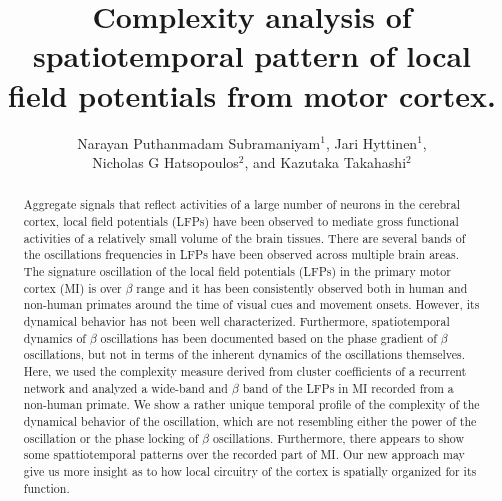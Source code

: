 \documentclass[a4paper]{jpconf}
\begin{document}
\title{Complexity analysis of spatiotemporal pattern of local field potentials from motor cortex.}

\author{Narayan Puthanmadam Subramaniyam$^1$, Jari Hyttinen$^1$, \\
Nicholas G Hatsopoulos$^2$, and Kazutaka Takahashi$^2$}

\address{1. Finland\\
2. Department of Organismal Biology and Anatomy, University of Chicago, Chicago, IL 60615, USA}



\begin{abstract}
Aggregate signals that reflect activities of a large number of neurons in the cerebral cortex, local field potentials (LFPs) have been observed to mediate gross functional activities of a relatively small volume of the brain tissues. There are several bands of the oscillations frequencies in LFPs have been observed across multiple brain areas. 
The signature oscillation of the local field potentials (LFPs) in the primary motor cortex (MI) is over $\beta$ range and it has been consistently observed both in human and non-human primates around the time of visual cues and movement onsets. 
However, its dynamical behavior has not been well characterized. Furthermore, spatiotemporal dynamics of $\beta$ oscillations has been documented based on the phase gradient of $\beta$ oscillations, but not in terms of the inherent dynamics of the oscillations themselves. Here, we used the complexity measure derived from cluster coefficients of a recurrent network and analyzed a wide-band and $\beta$ band of the LFPs in MI recorded from a non-human primate. We show a rather unique temporal profile of the complexity of the dynamical behavior of the oscillation, which are not resembling either the power of the oscillation or the phase locking of $\beta$ oscillations. Furthermore, there appears to show some spattiotemporal patterns over the recorded part of MI. Our new approach may give us more insight as to how local circuitry of the cortex is spatially organized for its function. 

\end{abstract}
\end{document}
